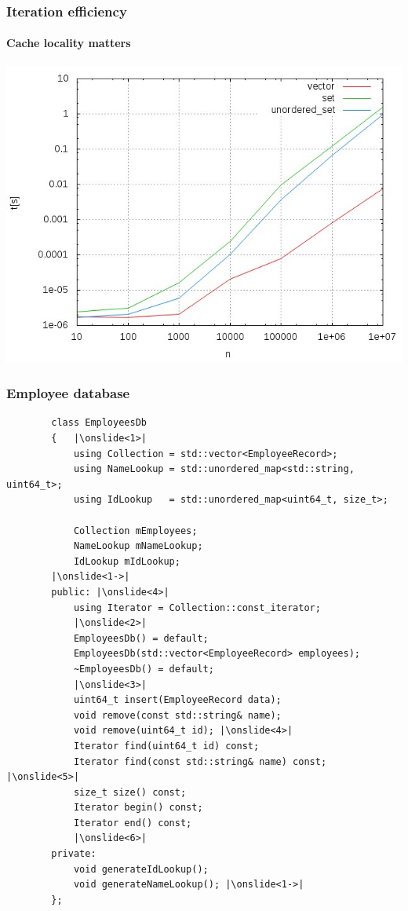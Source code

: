 \documentclass{beamer}
\begin{document}
\begin{frame}
\frametitle{Iteration efficiency}
\framesubtitle{Cache locality matters}
	\includegraphics[width=\textwidth,height=0.8\textheight,keepaspectratio]
					{col_iter.jpeg}
\end{frame}

\begin{frame}[fragile,t]
\frametitle{Employee database}
	\begin{lstlisting}
		class EmployeesDb
		{	|\onslide<1>|
		    using Collection = std::vector<EmployeeRecord>;
		    using NameLookup = std::unordered_map<std::string, uint64_t>;
		    using IdLookup   = std::unordered_map<uint64_t, size_t>;
		
		    Collection mEmployees;
		    NameLookup mNameLookup;
		    IdLookup mIdLookup;
		|\onslide<1->|
		public: |\onslide<4>|
		    using Iterator = Collection::const_iterator;
			|\onslide<2>|
		    EmployeesDb() = default;
		    EmployeesDb(std::vector<EmployeeRecord> employees);
		    ~EmployeesDb() = default;
			|\onslide<3>|
		    uint64_t insert(EmployeeRecord data);
		    void remove(const std::string& name);
		    void remove(uint64_t id); |\onslide<4>|
		    Iterator find(uint64_t id) const;
		    Iterator find(const std::string& name) const; |\onslide<5>|
		    size_t size() const;
		    Iterator begin() const;
		    Iterator end() const;
			|\onslide<6>|
		private:
		    void generateIdLookup();
		    void generateNameLookup(); |\onslide<1->|
		};
	\end{lstlisting}
\end{frame}
\end{document}
